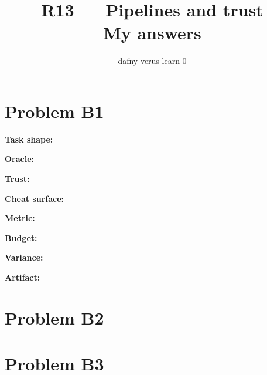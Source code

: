 \documentclass[11pt]{article}
\title{R13 --- Pipelines and trust \\ \large My answers}
\author{dafny-verus-learn-0}
\date{}
\begin{document}
\maketitle
\sloppy
\section*{Problem B1}\label{ans:B1}
\begin{answer}
\textbf{Task shape:} \vspace{1.1cm}

\textbf{Oracle:} \vspace{1.1cm}

\textbf{Trust:} \vspace{1.1cm}

\textbf{Cheat surface:} \vspace{1.1cm}

\textbf{Metric:} \vspace{1.1cm}

\textbf{Budget:} \vspace{1.1cm}

\textbf{Variance:} \vspace{1.1cm}

\textbf{Artifact:} \vspace{1.1cm}

\end{answer}
\section*{Problem B2}\label{ans:B2}
\begin{answer}\vspace{10cm}\end{answer}
\section*{Problem B3}\label{ans:B3}
\begin{answer}\vspace{10cm}\end{answer}
\end{document}
